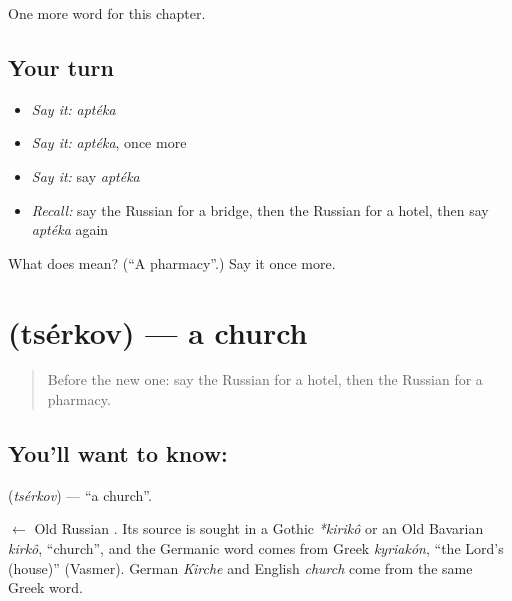 \begin{grammarlens}[title={What you've built}]
One more word for this chapter.
\end{grammarlens}

\subsection*{Your turn}
\begin{itemize}
\raggedright
  \item \emph{Say it:} \emph{aptéka}
  \item \emph{Say it:} \emph{aptéka}, once more
  \item \emph{Say it:} say \emph{aptéka}
  \item \emph{Recall:} say the Russian for a bridge, then the Russian for a hotel, then say \emph{aptéka} again
\end{itemize}

\begin{tcolorbox}[breakable,colback=teal!4,colframe=teal!35!black,title={Before you move on}]
What does  mean? (\textquotedblleft{}A pharmacy\textquotedblright{}.) Say it once more.
\end{tcolorbox}
\section[\texorpdfstring{\ru{церковь} (tsérkov)}{церковь (tsérkov)}]{ (tsérkov) — a church}

\label{lesson:RU-C80-church}



\begin{quote}
Before the new one: say the Russian for a hotel, then the Russian for a pharmacy.
\end{quote}

\subsection*{You'll want to know: }
\textbf{} (\emph{tsérkov}) — \textquotedblleft{}a church\textquotedblright{}.

\begin{cousinweb}
\textbf{} $\leftarrow$ Old Russian \emph{}. Its source is sought in a Gothic \emph{*kirikô} or an Old Bavarian \emph{kirkô}, \textquotedblleft{}church\textquotedblright{}, and the Germanic word comes from Greek \emph{kyriakón}, \textquotedblleft{}the Lord's (house)\textquotedblright{} (Vasmer). German \emph{Kirche} and English \emph{church} come from the same Greek word.
\end{cousinweb}

